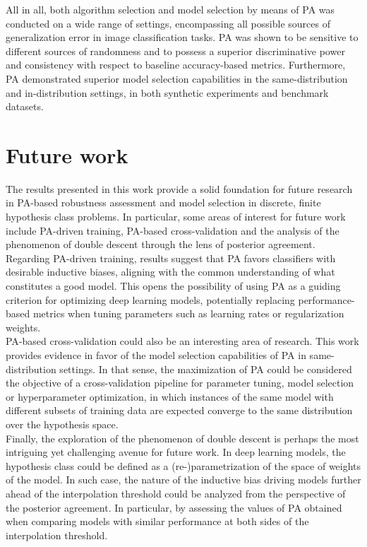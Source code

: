 All in all, both algorithm selection and model selection by means of PA was conducted on a wide range of settings,
encompassing all possible sources of generalization error in image classification tasks. PA was shown to be sensitive to
different sources of randomness and to possess a superior discriminative power and consistency with respect to baseline
accuracy-based metrics. Furthermore, PA demonstrated superior model selection capabilities in the same-distribution and
in-distribution settings, in both synthetic experiments and benchmark datasets. \\ 


\section*{Future work}

The results presented in this work provide a solid foundation for future research in PA-based 
robustness assessment and model selection in discrete, finite hypothesis class problems. In particular, some areas of interest for future work include
PA-driven training, PA-based cross-validation and the analysis of the phenomenon of double descent through
the lens of posterior agreement. \\

Regarding PA-driven training, results suggest that PA favors classifiers with desirable inductive biases, 
aligning with the common understanding of what constitutes a good model. This opens the possibility of 
using PA as a guiding criterion for optimizing deep learning models, potentially replacing performance-based 
metrics when tuning parameters such as learning rates or regularization weights. \\

PA-based cross-validation could also be an interesting area of research. This work provides evidence in favor of
the model selection capabilities of PA in same-distribution settings. In that sense, the maximization of PA could be
considered the objective of a cross-validation pipeline for parameter tuning, model selection or hyperparameter optimization, in which
instances of the same model with different subsets of training data are expected converge to the same distribution over
the hypothesis space. \\

Finally, the exploration of the phenomenon of double descent is perhaps the most intriguing yet challenging 
avenue for future work. In deep learning models, the hypothesis class could be defined as a (re-)parametrization of
the space of weights of the model. In such case, the nature of the inductive bias driving models further ahead of
the interpolation threshold could be analyzed from the perspective of the posterior agreement. In particular, by assessing
the values of PA obtained when comparing models with similar performance at both sides of the interpolation threshold. \\

\cleardoublepage
